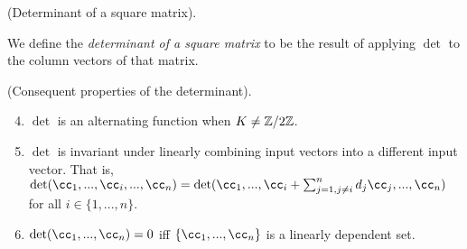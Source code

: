 \begin{defn}
    (Determinant of a square matrix). 
    
    We define the \textit{determinant of a square matrix} to be the result of applying $\det$ to the column vectors of that matrix.
\end{defn}


\begin{theorem}
\label{ch::exterior_pwrs::thm::consequent_det_props}
    (Consequent properties of the determinant). 
    
    \begin{enumerate}
    \setcounter{enumi}{3}
        \item $\det$ is an alternating function when $K \neq \mathbb{Z}/2\mathbb{Z}$.
        \item $\det$ is invariant under linearly combining input vectors into a different input vector. That is, $\det(\cc_1, ..., \cc_i, ..., \cc_n) = \det(\cc_1, ..., \cc_i + \sum_{j = 1, j \neq i}^n d_j \cc_j, ..., \cc_n)$ for all $i \in \{1, ..., n\}$.
        \item $\det(\cc_1, ..., \cc_n) = 0$ iff $\{\cc_1, ..., \cc_n\}$ is a linearly dependent set.
    \end{enumerate}
\end{theorem}

